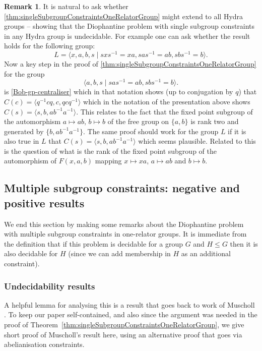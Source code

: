 \documentclass[11pt]{amsart}
\theoremstyle{definition}
\newtheorem{rmk}[theorem]{Remark}
\numberwithin{theorem}{section}
\begin{document}
\begin{rmk} It is natural to ask whether \cref{thm:singleSubgroupConstraintsOneRelatorGroup} might extend to all Hydra groups \cite{HydraGroups} -- showing that the Diophantine problem with single subgroup constraints in any Hydra group is undecidable. For example one can ask whether the result holds for the following group: 
\[
L = \langle 
x,a,b,s \mid sxs^{-1} = xa, sas^{-1} = ab, sbs^{-1}=b 
\rangle.
\]
Now a key step in the proof of \cref{thm:singleSubgroupConstraintsOneRelatorGroup} for the group 
\[
\langle 
a,b,s \mid sas^{-1} = ab, sbs^{-1}=b 
\rangle.
\]
is \cref{Bob-gp-centraliser} which in that notation shows (up to conjugation by $q$) that $C(c) = \langle q^{-1} c q, c, qcq^{-1} \rangle$ which in the notation of the presentation above shows $C(s) = \langle s, b, ab^{-1}a^{-1} \rangle$. This relates to the fact that the fixed point subgroup of the automorphism $a \mapsto ab$, $b \mapsto b$ of the free group on $\{a,b\}$ is rank two and generated by $\{b, ab^{-1}a^{-1} \}$. The same proof should work for the group $L$ if it is also true in $L$ that $C(s) = \langle s, b, ab^{-1}a^{-1} \rangle$ which seems plausible. Related to this is the question of what is the rank of the fixed point subgroup of the automorphism of $F(x,a,b)$ mapping $x \mapsto xa$, $a \mapsto ab$ and $b \mapsto b$.      
  \end{rmk}

\subsection*{Multiple subgroup constraints: negative and positive results}
We end this section by making some remarks about the Diophantine problem with multiple subgroup constraints in one-relator groups. It is immediate from the definition that if this problem is decidable for a group $G$ and $H \leq G$ then it is also decidable for $H$ (since we can add membership in $H$ as an additional constraint).   

\subsubsection*{Undecidability results} A helpful lemma for analysing this is a result that goes back to work of Muscholl \cite{MuschollThesis}. To keep our paper self-contained, and also since the argument was needed in the proof of Theorem~\ref{thm:singleSubgroupConstraintsOneRelatorGroup}, we give short proof of Muscholl's result here, using an alternative proof that goes via abelianisation constraints.  
\end{document}

